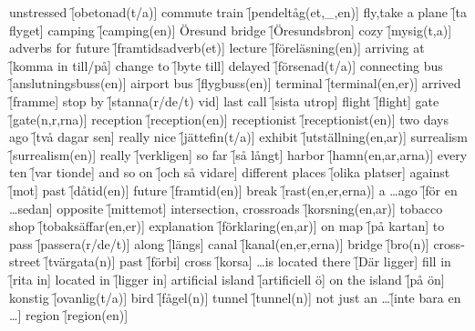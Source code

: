 \begin{questions}
\begin{multicols}{2}
        \question unstressed \f[obetonad(t/a)]
        \question commute train \f[pendeltåg(et,\_,en)]
        \question fly,take a plane \f[ta flyget]
        \question camping \f[camping(en)]
        \question Öresund bridge \f[Öresundsbron]
        \question cozy \f[mysig(t,a)]
        \question adverbs for future \f[framtidsadverb(et)]
        \question lecture \f[föreläsning(en)]
        \question arriving at \f[komma in till/på]
        \question change to \f[byte till]
        \question delayed \f[försenad(t/a)]
        \question connecting bus \f[anslutningsbuss(en)]
        \question airport bus \f[flygbuss(en)]
        \question terminal \f[terminal(en,er)]
        \question arrived \f[framme]
        \question stop by \f[stanna(r/de/t) vid]
        \question last call \f[sista utrop]
        \question flight \f[flight]
        \question gate \f[gate(n,r,rna)]
        \question reception \f[reception(en)]
        \question receptionist \f[receptionist(en)]
        \question two days ago \f[två dagar sen]
        \question really nice \f[jättefin(t/a)]
        \question exhibit \f[utställning(en,ar)]
        \question surrealism \f[surrealism(en)]
        \question really \f[verkligen]
        \question so far \f[så långt]
        \question harbor \f[hamn(en,ar,arna)]
        \question every ten \f[var tionde]
        \question and so on \f[och så vidare]
        \question different places \f[olika platser]
        \question against \f[mot]
        \question past \f[dåtid(en)]
        \question future \f[framtid(en)]
        \question break \f[rast(en,er,erna)]
        \question a \ldots ago \f[för en \ldots sedan]
        \question opposite \f[mittemot]
        \question intersection, crossroads \f[korsning(en,ar)]
        \question tobacco shop \f[tobaksäffar(en,er)]
        \question explanation \f[förklaring(en,ar)]
        \question on map \f[på kartan]
        \question to pass \f[passera(r/de/t)]
        \question along \f[längs]
        \question canal \f[kanal(en,er,erna)]
        \question bridge \f[bro(n)]
        \question cross-street \f[tvärgata(n)]
        \question past \f[förbi]
        \question cross \f[korsa]
        \question \ldots is located there \f[Där ligger]
        \question fill in \f[rita in]
        \question located in \f[ligger in]
        \question artificial island \f[artificiell ö]
        \question on the island \f[på ön]
        \question konstig \f[ovanlig(t/a)]
        \question bird \f[fågel(n)]
        \question tunnel \f[tunnel(n)]
        \question not just an \ldots \f[inte bara en \ldots]
        \question region \f[region(en)]

\end{multicols}
\end{questions}
